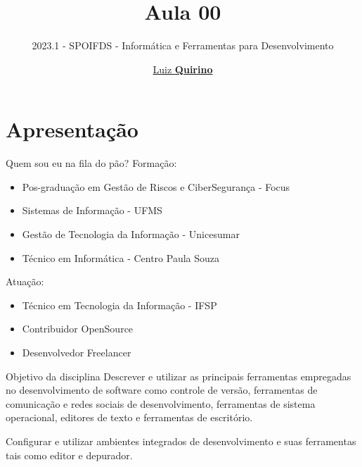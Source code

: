 \documentclass{beamer}
\title{Aula 00}
\subtitle{2023.1 - SPOIFDS - Informática e Ferramentas para Desenvolvimento }
\author{\href{mailto:luizfpq@gmail.com}{Luiz \textbf{Quirino}}}
\newcommand{\hrefcol}[2]{\textcolor{cyan}{\href{#1}{#2}}}
\begin{document}
\maketitle

%
%




\section{Apresentação}

\begin{frame}{Quem sou eu na fila do pão?}
Formação:
\begin{itemize}
\item Pos-graduação em Gestão de Riscos e CiberSegurança - Focus
\item Sistemas de Informação - UFMS
\item Gestão de Tecnologia da Informação - Unicesumar
\item Técnico em Informática - Centro Paula Souza
\end{itemize}
Atuação:
\begin{itemize}
\item Técnico em Tecnologia da Informação - IFSP
\item Contribuidor OpenSource
\item Desenvolvedor Freelancer
\end{itemize}

\end{frame}

\begin{frame}{Objetivo da disciplina}\justifying
      Descrever e utilizar as principais ferramentas empregadas no desenvolvimento de software como controle de versão, ferramentas de comunicação e redes sociais de desenvolvimento, ferramentas de sistema operacional, editores de texto e ferramentas de escritório.
      
      Configurar e utilizar ambientes integrados de desenvolvimento e suas ferramentas tais como editor e depurador.
      
\end{frame}
\end{document}
